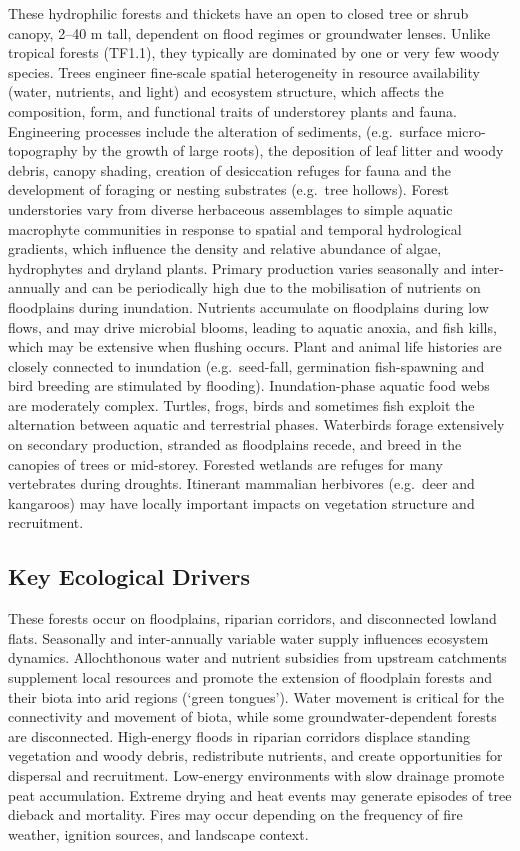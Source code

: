 \documentclass[
  letterpaper,
  DIV=11,
  numbers=noendperiod]{scrartcl}
\begin{document}
These hydrophilic forests and thickets have an open to closed tree or
shrub canopy, 2--40 m tall, dependent on flood regimes or groundwater
lenses. Unlike tropical forests (TF1.1), they typically are dominated by
one or very few woody species. Trees engineer fine-scale spatial
heterogeneity in resource availability (water, nutrients, and light) and
ecosystem structure, which affects the composition, form, and functional
traits of understorey plants and fauna. Engineering processes include
the alteration of sediments, (e.g.~surface micro-topography by the
growth of large roots), the deposition of leaf litter and woody debris,
canopy shading, creation of desiccation refuges for fauna and the
development of foraging or nesting substrates (e.g.~tree hollows).
Forest understories vary from diverse herbaceous assemblages to simple
aquatic macrophyte communities in response to spatial and temporal
hydrological gradients, which influence the density and relative
abundance of algae, hydrophytes and dryland plants. Primary production
varies seasonally and inter-annually and can be periodically high due to
the mobilisation of nutrients on floodplains during inundation.
Nutrients accumulate on floodplains during low flows, and may drive
microbial blooms, leading to aquatic anoxia, and fish kills, which may
be extensive when flushing occurs. Plant and animal life histories are
closely connected to inundation (e.g.~seed-fall, germination
fish-spawning and bird breeding are stimulated by flooding).
Inundation-phase aquatic food webs are moderately complex. Turtles,
frogs, birds and sometimes fish exploit the alternation between aquatic
and terrestrial phases. Waterbirds forage extensively on secondary
production, stranded as floodplains recede, and breed in the canopies of
trees or mid-storey. Forested wetlands are refuges for many vertebrates
during droughts. Itinerant mammalian herbivores (e.g.~deer and
kangaroos) may have locally important impacts on vegetation structure
and recruitment.

\subsection{Key Ecological Drivers}\label{key-ecological-drivers-104}

These forests occur on floodplains, riparian corridors, and disconnected
lowland flats. Seasonally and inter-annually variable water supply
influences ecosystem dynamics. Allochthonous water and nutrient
subsidies from upstream catchments supplement local resources and
promote the extension of floodplain forests and their biota into arid
regions (`green tongues'). Water movement is critical for the
connectivity and movement of biota, while some groundwater-dependent
forests are disconnected. High-energy floods in riparian corridors
displace standing vegetation and woody debris, redistribute nutrients,
and create opportunities for dispersal and recruitment. Low-energy
environments with slow drainage promote peat accumulation. Extreme
drying and heat events may generate episodes of tree dieback and
mortality. Fires may occur depending on the frequency of fire weather,
ignition sources, and landscape context.
\end{document}
